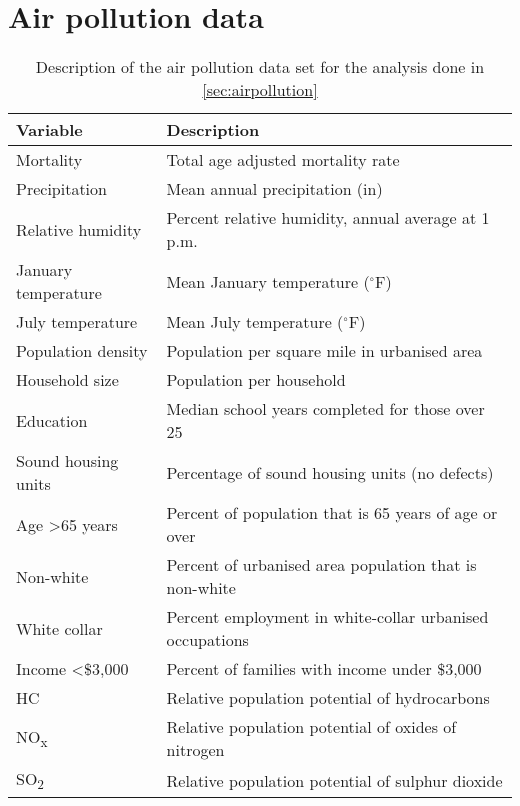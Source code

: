 
\section{Air pollution data}
\label{apx:airpollution}

\begin{table}[H]
\centering
\caption{Description of the air pollution data set for the analysis done in \cref{sec:airpollution}}
\label{tab:airpollution}
\begin{tabular}{ll}
\toprule
Variable                 & Description \\
\midrule
Mortality                & Total age adjusted mortality rate \\
Precipitation            & Mean annual precipitation (in) \\
Relative humidity        & Percent relative humidity, annual average at 1 p.m. \\
January temperature      & Mean January temperature ($^\circ$F) \\
July temperature         & Mean July temperature ($^\circ$F) \\
Population density       & Population per square mile in urbanised area \\
Household size & Population per household  \\
Education                & Median school years completed for those over 25 \\
Sound housing units      & Percentage of sound housing units (no defects) \\
Age >65 years            & Percent of population that is 65 years of age or over \\
Non-white                & Percent of urbanised area population that is non-white \\
White collar             & Percent employment in white-collar urbanised occupations \\
Income <\$3,000          & Percent of families with income under \$3,000 \\      
HC                       & Relative population potential of hydrocarbons \\     
NO\textsubscript{x}      & Relative population potential of oxides of nitrogen \\
SO\textsubscript{2}      & Relative population potential of sulphur dioxide \\       
\end{tabular}
\end{table}

